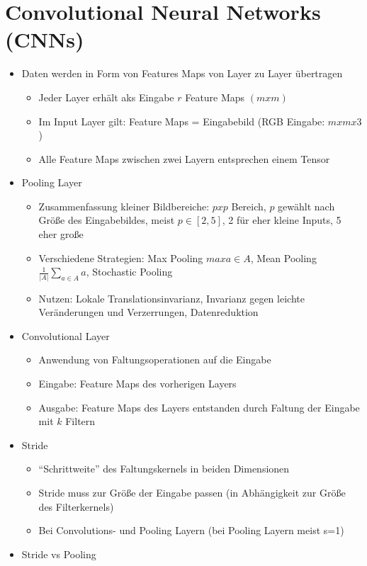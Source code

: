 \documentclass[paper=a4, fontsize=11pt]{scrartcl} %
\numberwithin{equation}{section} %
\numberwithin{figure}{section} %
\numberwithin{table}{section} %
\begin{document}
\section{Convolutional Neural Networks (CNNs)}

\begin{itemize}
\item Daten werden in Form von Features Maps von Layer zu Layer übertragen
\begin{itemize}
\item Jeder Layer erhält aks Eingabe $r$ Feature Maps $(mxm)$
\item Im Input Layer gilt: Feature Maps = Eingabebild (RGB Eingabe: $mxmx3$)
\item Alle Feature Maps zwischen zwei Layern entsprechen einem Tensor
\end{itemize}
\item Pooling Layer
\begin{itemize}
\item Zusammenfassung kleiner Bildbereiche: $pxp$ Bereich, $p$ gewählt nach Größe des Eingabebildes, meist $p \in [2,5]$, 2 für eher kleine Inputs, 5 eher große
\item Verschiedene Strategien: Max Pooling $max {a \in A}$, Mean Pooling $\frac{1}{|A|} \sum\limits_{a \in A}a$, Stochastic Pooling
\item Nutzen: Lokale Translationsinvarianz, Invarianz gegen leichte Veränderungen und Verzerrungen, Datenreduktion
\end{itemize}
\item Convolutional Layer
\begin{itemize}
\item Anwendung von Faltungsoperationen auf die Eingabe
\item Eingabe: Feature Maps des vorherigen Layers
\item Ausgabe: Feature Maps des Layers entstanden durch Faltung der Eingabe mit $k$ Filtern
\end{itemize}
\item Stride
\begin{itemize}
\item ``Schrittweite'' des Faltungskernels in beiden Dimensionen
\item Stride muss zur Größe der Eingabe passen (in Abhängigkeit zur Größe des Filterkernels)
\item Bei Convolutions- und Pooling Layern (bei Pooling Layern meist s=1)
\end{itemize}
\item Stride vs Pooling

\end{itemize}
\end{document}
